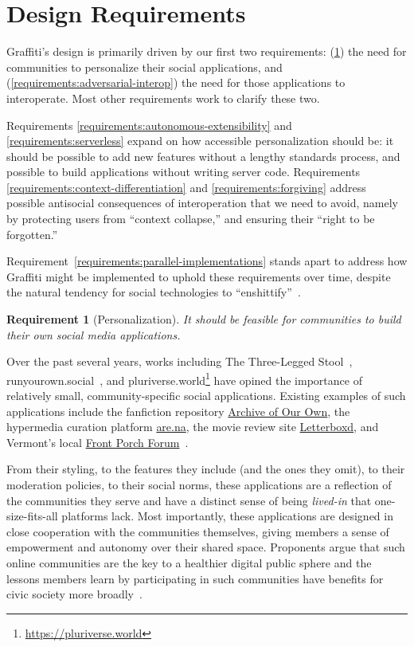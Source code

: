 \newtheorem{requirement}{Requirement}

\section{Design Requirements}
\label{requirements}

Graffiti's design is primarily driven by our
first two requirements:
(\ref{requirements:personalization})
the need for communities to personalize
their social applications,
and (\ref{requirements:adversarial-interop})
the need for those applications to interoperate.
Most other requirements work to clarify these two.

Requirements \ref{requirements:autonomous-extensibility}
and \ref{requirements:serverless} expand on how accessible
personalization should be: it should be possible to add new features
without a lengthy standards process, and possible to build
applications without writing server code.
Requirements \ref{requirements:context-differentiation}
and \ref{requirements:forgiving}
address possible antisocial consequences of
interoperation that we need to avoid,
namely by protecting users from ``context collapse,''
and ensuring their ``right to be forgotten.''

Requirement~{\ref{requirements:parallel-implementations}} stands apart to address
how Graffiti might be implemented to uphold these requirements over time, despite
the natural tendency for social technologies to ``enshittify''~{\cite{enshittification}}.

\begin{requirement}[Personalization]
\label{requirements:personalization}
   It should be feasible for communities to build
   their own social media applications.
\end{requirement}

Over the past several years,
works including
The Three-Legged Stool~\cite{threeleggedstool},
runyourown.social~\cite{runyourownsocial},
and pluriverse.world\footnote{\url{https://pluriverse.world}}
have opined the importance of relatively small,
community-specific social applications.
Existing examples of such applications include the fanfiction
repository \href{https://archiveofourown.org/}{Archive of Our Own},
the hypermedia curation platform \href{https://www.are.na}{are.na},
the movie review site \href{https://letterboxd.com/}{Letterboxd},
and Vermont's local \href{https://frontporchforum.com/}{Front Porch Forum}~\cite{threeleggedstool}.

From their styling, to the features they include (and the ones they omit),
to their moderation policies, to their social norms, these applications
are a reflection of the communities they serve and have a
distinct sense of being \emph{lived-in}
that one-size-fits-all platforms lack.
Most importantly, these applications are designed in close cooperation with the communities themselves,
giving members a sense of empowerment and autonomy over their shared space.
Proponents argue that such online communities are the key to a healthier
digital public sphere and the lessons members learn by participating in such
communities have benefits for civic society more broadly~\cite{threeleggedstool, runyourownsocial, archiveoftheirown}.


